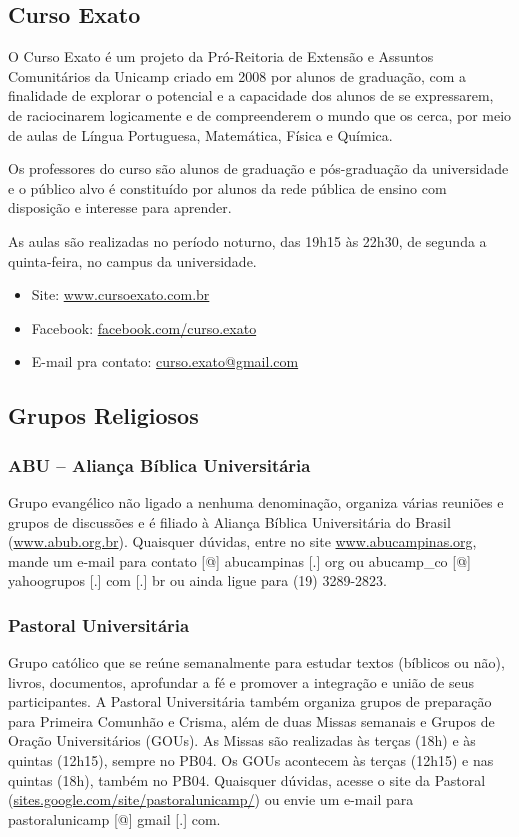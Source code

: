 \subsection{Curso Exato}

O Curso Exato é um projeto da Pró-Reitoria de Extensão e Assuntos Comunitários
da Unicamp criado em 2008 por alunos de graduação, com a finalidade de explorar
o potencial e a capacidade dos alunos de se expressarem, de raciocinarem
logicamente e de compreenderem o mundo que os cerca, por meio de aulas de Língua
Portuguesa, Matemática, Física e Química.

Os professores do curso são alunos de graduação e pós-graduação da universidade
e o público alvo é constituído por alunos da rede pública de ensino com
disposição e interesse para aprender.

As aulas são realizadas no período noturno, das 19h15 às 22h30, de segunda
a quinta-feira, no campus da universidade.

\begin{itemize}
\item Site: \url{www.cursoexato.com.br}
\item Facebook: \url{facebook.com/curso.exato}
\item E-mail pra contato: \url{curso.exato@gmail.com}
\end{itemize}

\subsection{Grupos Religiosos}

\subsubsection{ABU -- Aliança Bíblica Universitária}

Grupo evangélico não ligado a nenhuma denominação, organiza várias reuniões
e grupos de discussões e é filiado à Aliança Bíblica Universitária do Brasil
(\url{www.abub.org.br}). Quaisquer dúvidas, entre no site
\url{www.abucampinas.org}, mande um e-mail para contato [@] abucampinas
[.] org ou abucamp\_co [@] yahoogrupos [.] com [.] br ou ainda ligue para (19)
3289-2823.

\subsubsection{Pastoral Universitária}

Grupo católico que se reúne semanalmente para estudar textos (bíblicos ou não),
livros, documentos, aprofundar a fé e promover a integração e união de seus
participantes. A Pastoral Universitária também organiza grupos de preparação
para Primeira Comunhão e Crisma, além de duas Missas semanais e Grupos de Oração
Universitários (GOUs). As Missas são realizadas às terças (18h) e às
quintas (12h15), sempre no PB04. Os GOUs acontecem às terças (12h15) e
nas quintas (18h), também no PB04. Quaisquer dúvidas, acesse o site da
Pastoral (\url{sites.google.com/site/pastoralunicamp/}) ou
envie um e-mail para pastoralunicamp [@] gmail [.] com.

